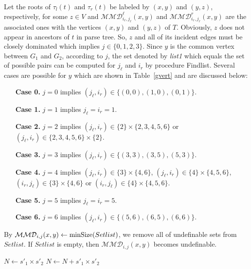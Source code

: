 \documentclass[12pt]{article}
\theoremstyle{definition}
\theoremstyle{remark}
\begin{document}
Let the roots of $\tau_l(t)$ and $\tau_r(t)$ be labeled by $(x,y)$ and $(y,z)$, respectively, for some $z \in V$ and  $\mathcal{MMD}_{i_\ell,j_\ell}^\ell(x,y)$ and $\mathcal{MMD}_{i_r,j_r}^r(x,y)$ are the  associated ones with the vertices $(x,y)$ and $(y,z)$ of $T$.
Obviously, $z$ does not appear in ancestors of $t$ in parse tree. So, $z$ and all of its incident edges must be closely dominated which implies $j\in\{0,1,2,3\}$. Since $y$ is the common vertex between $G_1$ and $G_2$, according to $j$, the set denoted by \textit{list1} which equals the set of  possible pairs can be computed for $j_{\ell}$ and $i_r$ by procedure Findlist. Several  cases are possible for $y$ which are shown in Table~\ref{gvert} and are discussed below:

\begin{itemize}
	\item[\textbf{Case 0.}]
		$j=0$ implies  $(j_{\ell},i_r)\in\{(0,0),(1,0),(0,1)\}$.
	\item[\textbf{Case 1.}]
	$j=1$ implies  $j_{\ell}=i_r=1$.
	
	\item[\textbf{Case 2.}]
	$j=2$ implies   $(j_{\ell},i_r)\in \{2\}\times \{2,3,4,5,6\}$  or $(j_{\ell},i_r)\in \{2,3,4,5,6\}\times\{2\}$.
	\item[\textbf{Case 3.}]
	$j=3$ implies   $(j_{\ell},i_r)\in\{(3,3),(3,5),(5,3)\}$.
	\item[\textbf{Case 4.}]
	$j=4$ implies    $(j_{\ell},i_r)\in \{3\}\times \{4,6\}$, $(j_{\ell},i_r)\in \{4\}\times \{4,5,6\}$, $(i_r,j_{\ell})\in \{3\}\times \{4,6\}$ or $(i_r,j_{\ell})\in \{4\}\times \{4,5,6\}$.  
		\item[\textbf{Case 5.}]
	$j=5$ implies   $j_{\ell}=i_r=5$.
	\item[\textbf{Case 6.}]
	$j=6$ implies   $(j_{\ell},i_r)\in\{(5,6),(6,5),(6,6)\}$.
\end{itemize}

By $\mathcal{MMD}_{i,j}(x,y)\leftarrow \mbox{minSize}(Setlist)$, we remove all of undefinable sets from $Setlist$. If $Setlist$ is empty, then 
$\mathcal{MMD}_{i,j}(x,y)$ becomes undefinable.

\begin{algorithm}[h!]
\begin{algorithmic}[1]
	\State $N \gets s'_1 \times s'_2$
	\State $N \gets N+ s'_1 \times s'_2$
	\EndIf
	\EndProcedure
\end{algorithmic}
\end{algorithm}
\end{document}
